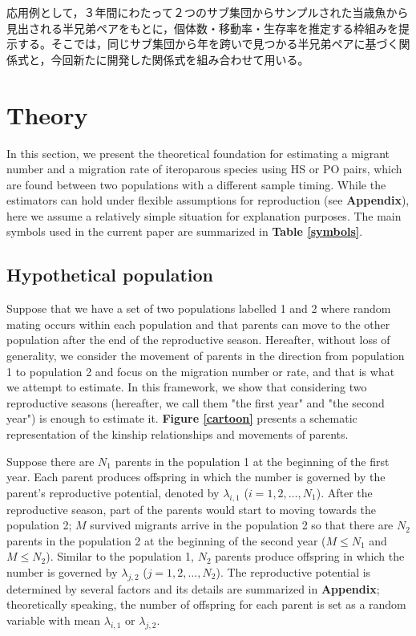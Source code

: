 \documentclass[12pt, English]{article}
\begin{document}
\begin{spacing}{1.9}
応用例として，３年間にわたって２つのサブ集団からサンプルされた当歳魚から見出される半兄弟ペアをもとに，個体数・移動率・生存率を推定する枠組みを提示する。そこでは，同じサブ集団から年を跨いで見つかる半兄弟ペアに基づく関係式と，今回新たに開発した関係式を組み合わせて用いる。

\section{Theory}\label{sec2}
In this section, we present the theoretical foundation for estimating a migrant number and a migration rate of iteroparous species using HS or PO pairs, which are found between two populations with a different sample timing. While the estimators can hold under flexible assumptions for reproduction (see {\bf Appendix}), here we assume a relatively simple situation for explanation purposes. The main symbols used in the current paper are summarized in {\bf Table \ref{symbols}}. 

\begin{center}
\end{center}

\subsection{Hypothetical population}

Suppose that we have a set of two populations labelled 1 and 2 where random mating occurs within each population and that parents can move to the other population after the end of the reproductive season. Hereafter, without loss of generality, we consider the movement of parents in the direction from population 1 to population 2 and focus on the migration number or rate, and that is what we attempt to estimate. In this framework, we show that considering two reproductive seasons (hereafter, we call them "the first year" and "the second year") is enough to estimate it. {\bf Figure \ref{cartoon}} presents a schematic representation of the kinship relationships and movements of parents. 

Suppose there are $N_1$ parents in the population 1 at the beginning of the first year. Each parent produces offspring in which the number is governed by the parent's reproductive potential, denoted by $\lambda_{i,1}$ ($i=1,2,\ldots,N_1$). After the reproductive season, part of the parents would start to moving towards the population 2; $M$ survived migrants arrive in the population 2 so that there are $N_2$ parents in the population 2 at the beginning of the second year ($M \le N_1$ and $M \le N_2$). Similar to the population 1, $N_2$ parents produce offspring in which the number is governed by $\lambda_{j,2}$ ($j=1,2,\ldots,N_2$). The reproductive potential is determined by several factors and its details are summarized in {\bf Appendix}; theoretically speaking, the number of offspring for each parent is set as a random variable with mean $\lambda_{i,1}$ or $\lambda_{j,2}$. 


\end{spacing}
\end{document}

